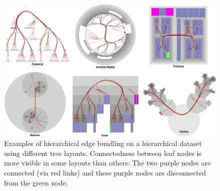 \documentclass[a4paper]{llncs}
\begin{document}


\begin{figure}[htb]
 \centering
 \includegraphics[width=\textwidth]{figures/Teaser.png}
 \caption{Examples of hierarchical edge bundling on a hierarchical dataset using different tree layouts. Connectedness between leaf nodes is more visible in some layouts than others: The two purple nodes are connected (via red links) and these purple nodes are disconnected from the green node.}
 \label{fig:teaser}
\end{figure}

\end{document}
